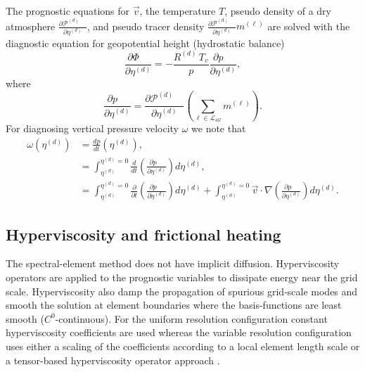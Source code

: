 \documentclass{agujournal}
\begin{document}
{The prognostic equations for $\vec{v}$, the temperature $T$, pseudo density of a dry atmosphere ${\frac{\partial {\mathcal{P}^{(d)}}\quad }{\partial \eta^{(d)}}}$, and pseudo tracer density ${\frac{\partial {\mathcal{P}^{(d)}}\quad }{\partial \eta^{(d)}}} m^{(\ell)}$ are solved with the diagnostic equation for geopotential height (hydrostatic balance)
\begin{equation}
\frac{\partial \Phi\quad }{\partial \eta^{(d)}}=-\frac{R^{(d)} \,T_v}{p}\frac{\partial p\quad }{\partial \eta^{(d)}},\label{eq:phi_1}
\end{equation}
where
\begin{equation}
\frac{\partial p\quad }{\partial \eta^{(d)}}=\frac{\partial \mathcal{P}^{(d)}\quad }{\partial \eta^{(d)}}\left( \sum_{\ell \in \mathcal{L}_{all}} m^{(\ell)}\right).
\end{equation}
For diagnosing vertical pressure velocity $\omega$ we note that
\begin{align}
\omega(\eta^{(d)})&=\frac{dp}{dt}(\eta^{(d)}),\\
      &=\int_{\eta^{(d)}}^{\eta^{(d)}=0}\frac{d}{dt}\left( \frac{\partial p\quad }{\partial \eta^{(d)}}\right)d\eta^{(d)},\\
      &=\int_{\eta^{(d)}}^{\eta^{(d)}=0}\frac{\partial}{\partial t}\left( \frac{\partial p\quad }{\partial \eta^{(d)}}\right)d\eta^{(d)}+\int_{\eta^{(d)}}^{\eta^{(d)}=0} \vec{v}\cdot \nabla \left( \frac{\partial p\quad }{\partial \eta^{(d)}}\right)d\eta^{(d)}.\label{eq:omega}
\end{align}
\subsection{Hyperviscosity and frictional heating}
The spectral-element method does not have implicit diffusion. Hyperviscosity operators are applied to the prognostic variables to dissipate energy near the grid scale. Hyperviscosity also damp the propagation of spurious grid-scale modes \citep{AW2009SIAM} and smooth the solution at element boundaries where the basis-functions are least smooth ($C^0$-continuous). For the uniform resolution configuration constant hyperviscosity coefficients are used whereas the variable resolution configuration uses either a scaling of the coefficients according to a local element length scale \citep{ZJT2013} or a tensor-based hyperviscosity operator approach \citep{GetAl2014GMD}.
}
\end{document}
